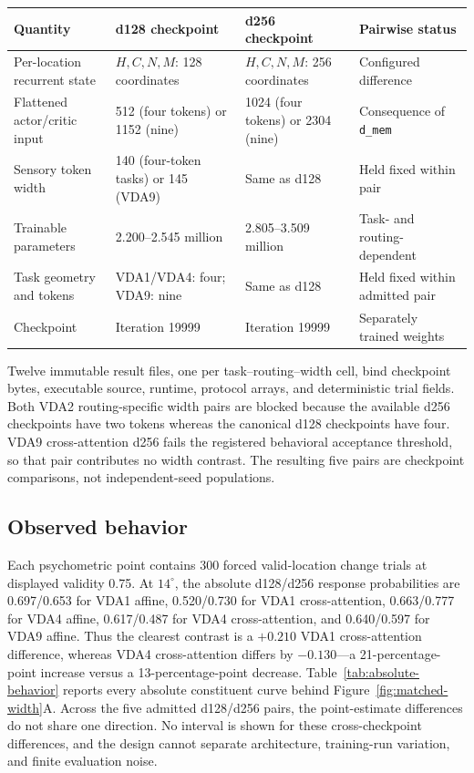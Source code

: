 \documentclass[11pt,a4paper]{article}
\begin{document}
\begingroup\small
{}\label{tab:width-comparison}
\begin{tabularx}{\textwidth}{@{}p{4.0cm}Y Y Y@{}}
\toprule
Quantity & d128 checkpoint & d256 checkpoint & Pairwise status\\
\midrule
Per-location recurrent state & $H,C,N,M$: 128 coordinates & $H,C,N,M$: 256 coordinates & Configured difference\\
Flattened actor/critic input & 512 (four tokens) or 1152 (nine) & 1024 (four tokens) or 2304 (nine) & Consequence of \texttt{d\_mem}\\
Sensory token width & 140 (four-token tasks) or 145 (VDA9) & Same as d128 & Held fixed within pair\\
Trainable parameters & 2.200--2.545 million & 2.805--3.509 million & Task- and routing-dependent\\
Task geometry and tokens & VDA1/VDA4: four; VDA9: nine & Same as d128 & Held fixed within admitted pair\\
Checkpoint & Iteration 19999 & Iteration 19999 & Separately trained weights\\
\bottomrule
\end{tabularx}
\endgroup

Twelve immutable result files, one per task--routing--width cell, bind checkpoint bytes, executable source, runtime, protocol arrays, and deterministic trial fields. Both VDA2 routing-specific width pairs are blocked because the available d256 checkpoints have two tokens whereas the canonical d128 checkpoints have four. VDA9 cross-attention d256 fails the registered behavioral acceptance threshold, so that pair contributes no width contrast. The resulting five pairs are checkpoint comparisons, not independent-seed populations.

\subsection{Observed behavior}
Each psychometric point contains 300 forced valid-location change trials at displayed validity 0.75. At $14^\circ$, the absolute d128/d256 response probabilities are 0.697/0.653 for VDA1 affine, 0.520/0.730 for VDA1 cross-attention, 0.663/0.777 for VDA4 affine, 0.617/0.487 for VDA4 cross-attention, and 0.640/0.597 for VDA9 affine. Thus the clearest contrast is a $+0.210$ VDA1 cross-attention difference, whereas VDA4 cross-attention differs by $-0.130$---a 21-percentage-point increase versus a 13-percentage-point decrease. Table~\ref{tab:absolute-behavior} reports every absolute constituent curve behind Figure~\ref{fig:matched-width}A. Across the five admitted d128/d256 pairs, the point-estimate differences do not share one direction. No interval is shown for these cross-checkpoint differences, and the design cannot separate architecture, training-run variation, and finite evaluation noise.
\end{document}
